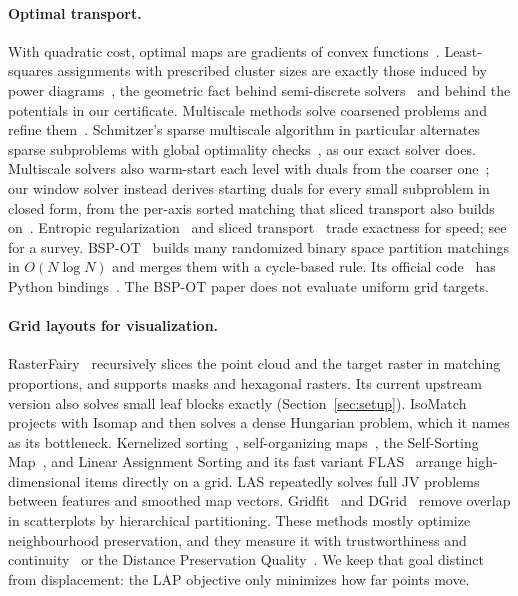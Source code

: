 \paragraph{Optimal transport.} With quadratic cost, optimal maps are gradients of
convex functions~\citep{brenier1991polar}. Least-squares assignments with prescribed
cluster sizes are exactly those induced by power
diagrams~\citep{aurenhammer1998minkowski}, the geometric fact behind semi-discrete
solvers~\citep{merigot2011multiscale,levy2015numerical} and behind the potentials in our
certificate. Multiscale methods solve coarsened problems and refine
them~\citep{merigot2011multiscale,schmitzer2016sparse,gerber2017multiscale}. Schmitzer's
sparse multiscale algorithm in particular alternates sparse subproblems with global
optimality checks~\citep{schmitzer2016sparse}, as our exact solver does. Multiscale
solvers also warm-start each level with duals from the coarser
one~\citep{merigot2011multiscale,schmitzer2016sparse}; our window solver instead derives
starting duals for every small subproblem in closed form, from the per-axis sorted matching
that sliced transport also builds on~\citep{rabin2012wasserstein,bonneel2015sliced}. Entropic
regularization~\citep{cuturi2013sinkhorn} and sliced
transport~\citep{rabin2012wasserstein,bonneel2015sliced} trade exactness for speed; see
\citet{peyre2019computational} for a survey. BSP-OT~\citep{genest2025bspot} builds many
randomized binary space partition matchings in $O(N\log N)$ and merges them with a
cycle-based rule. Its official code~\citep{genest2025bspotcode} has Python
bindings~\citep{takayama2026bspotpython,flamary2026potsoftware}. The BSP-OT paper does
not evaluate uniform grid targets.

\paragraph{Grid layouts for visualization.} RasterFairy~\citep{klingemann2015rasterfairy}
recursively slices the point cloud and the target raster in matching proportions, and
supports masks and hexagonal rasters. Its current upstream version also solves small
leaf blocks exactly (Section~\ref{sec:setup}). IsoMatch~\citep{fried2015isomatch}
projects with Isomap and then solves a dense Hungarian problem, which it names as its
bottleneck. Kernelized sorting~\citep{quadrianto2008kernelized,quadrianto2010kernelized},
self-organizing maps~\citep{kohonen1982selforganized}, the Self-Sorting
Map~\citep{strong2014selfsorting}, and Linear Assignment Sorting and its fast variant
FLAS~\citep{barthel2023improved} arrange high-dimensional items directly on a grid.
LAS repeatedly solves full JV problems between features and smoothed map vectors.
Gridfit~\citep{keim1998gridfit} and DGrid~\citep{hilasaca2024grid} remove overlap in
scatterplots by hierarchical partitioning. These methods mostly optimize neighbourhood
preservation, and they measure it with trustworthiness and
continuity~\citep{venna2001neighborhood,venna2006local} or the Distance Preservation
Quality~\citep{barthel2023improved}. We keep that goal distinct from displacement:
the LAP objective only minimizes how far points move.

